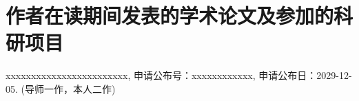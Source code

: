 \chapter{作者在读期间发表的学术论文及参加的科研项目}





\begin{enumerate}[{[1]}]
	\item{xxxxxxxxxxxxxxxxxxxxxxxx, 申请公布号：xxxxxxxxxxxx, 申请公布日：2029-12-05. (导师一作，本人二作)}

\end{enumerate}

